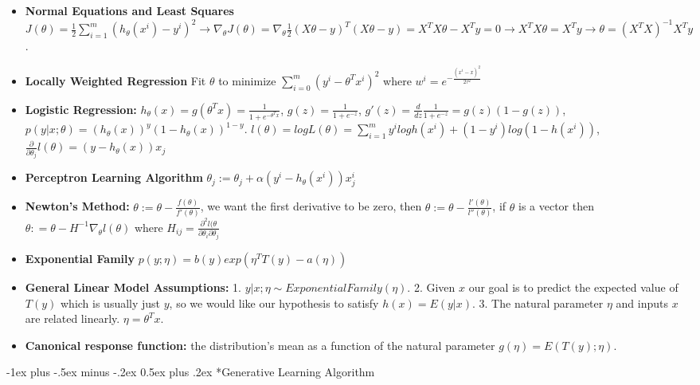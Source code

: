 \documentclass[10pt,landscape]{article}
\makeatletter
\renewcommand{\section}{\@startsection{section}{1}{0mm}%
                                {-1ex plus -.5ex minus -.2ex}%
                                {0.5ex plus .2ex}%
                                {\normalfont\large\bfseries}}
\makeatother
\begin{document}
\begin{multicols}{3}
\begin{itemize}
\item \textbf{Normal Equations and Least Squares} $J(\theta) = \frac{1}{2}\sum_{i = 1}^{m}(h_\theta(x^i)- y^i)^2 \rightarrow \nabla_\theta J(\theta)  = \nabla_\theta \frac{1}{2}(X\theta -y)^T(X\theta -y) =  X^TX\theta - X^Ty  = 0 \rightarrow X^TX\theta = X^Ty \rightarrow \theta = (X^TX)^{-1}X^Ty$. 
\item \textbf{Locally Weighted Regression} Fit $\theta$ to minimize $\sum_{i = 0}^{m	} (y^i-\theta^Tx^i)^2$ where $w^i = e^{-\frac{(x^i-x)^2}{2\tau^2}}$
\item \textbf{Logistic Regression:} $h_\theta(x) = g(\theta^T x) = \frac{1}{1+ e^{-\theta^Tx}}$, $g(z) = \frac{1}{1+e^{-z}}$, $g'(z) = \frac{d}{dz}\frac{1}{1+e^{-z}} = g(z)(1-g(z))$, $p(y |x; \theta) = (h_\theta(x))^y(1-h_\theta(x))^{1-y}$. $l(\theta) = log L(\theta) = \sum_{i = 1}^{m} y^i logh(x^i) + (1-y^i) log(1-h(x^i))$, $\frac{\partial}{\partial \theta_j} l(\theta) = (y- h_\theta(x))x_j$
\item \textbf{Perceptron Learning Algorithm} $\theta_j := \theta_j + \alpha (y^i - h_\theta(x^i))x_j^i$
\item \textbf{Newton's Method: } $\theta := \theta - \frac{f(\theta)}{f'(\theta)}$, we want the first derivative to be zero, then $\theta := \theta - \frac{l'(\theta)}{l''(\theta)}$, if $\theta$ is a vector then $\theta: = \theta - H^{-1}\nabla_\theta l(\theta)$ where $H_{ij} = \frac{\partial ^2 l(\theta}{\partial \theta_i \partial \theta_j}$
\item \textbf{Exponential Family}  $p(y; \eta)  =b(y)exp(\eta^TT(y) - a(\eta))$
\item \textbf{General Linear Model Assumptions:} 1. $y|x; \eta \sim ExponentialFamily(\eta)$. 2. Given $x$ our goal is to predict the expected value of $T(y)$ which is usually just $y$, so we would like our hypothesis to satisfy $h(x) = E(y|x)$. 3. The natural parameter $\eta$ and inputs $x$ are related linearly. $\eta = \theta^Tx$. 
\item \textbf{Canonical response function:} the distribution's mean as a function of the natural parameter $g(\eta) = E(T(y); \eta)$. 
\end{itemize}
\section*{Generative Learning Algorithm}

\end{multicols}
\end{document}
